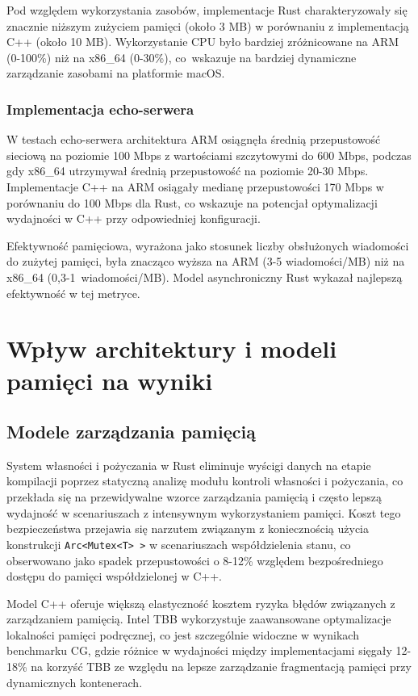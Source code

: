 Pod względem wykorzystania zasobów, implementacje Rust charakteryzowały się znacznie niższym zużyciem pamięci (około 3 MB) w porównaniu z implementacją C++ (około 10 MB). Wykorzystanie CPU było bardziej zróżnicowane na ARM (0-100\%) niż na x86\_64 (0-30\%), co~wskazuje na bardziej dynamiczne zarządzanie zasobami na platformie macOS.

\subsubsection{Implementacja echo-serwera}

W testach echo-serwera architektura ARM osiągnęła średnią przepustowość sieciową na poziomie 100 Mbps z wartościami szczytowymi do 600 Mbps, podczas gdy x86\_64 utrzymywał średnią przepustowość na poziomie 20-30 Mbps. Implementacje C++ na ARM osiągały medianę przepustowości 170 Mbps w porównaniu do 100 Mbps dla Rust, co wskazuje na potencjał optymalizacji wydajności w C++ przy odpowiedniej konfiguracji.

Efektywność pamięciowa, wyrażona jako stosunek liczby obsłużonych wiadomości do zużytej pamięci, była znacząco wyższa na ARM (3-5 wiadomości/MB) niż na x86\_64 \mbox{(0,3-1 wiadomości/MB)}. Model asynchroniczny Rust wykazał najlepszą efektywność w tej metryce.

\section{Wpływ architektury i modeli pamięci na wyniki}

\subsection{Modele zarządzania pamięcią}

System własności i pożyczania w Rust eliminuje wyścigi danych na etapie kompilacji poprzez statyczną analizę modułu kontroli własności i pożyczania, co przekłada się na przewidywalne wzorce zarządzania pamięcią i często lepszą wydajność w scenariuszach z intensywnym wykorzystaniem pamięci. Koszt tego bezpieczeństwa przejawia się narzutem związanym z koniecznością użycia konstrukcji \texttt{Arc<Mutex<T> >} w scenariuszach współdzielenia stanu, co obserwowano jako spadek przepustowości o 8-12\% względem bezpośredniego dostępu do pamięci współdzielonej w C++.

Model C++ oferuje większą elastyczność kosztem ryzyka błędów związanych z zarządzaniem pamięcią. Intel TBB wykorzystuje zaawansowane optymalizacje lokalności pamięci podręcznej, co jest szczególnie widoczne w wynikach benchmarku CG, gdzie różnice w wydajności między implementacjami sięgały 12-18\% na korzyść TBB ze względu na lepsze zarządzanie fragmentacją pamięci przy dynamicznych kontenerach.

